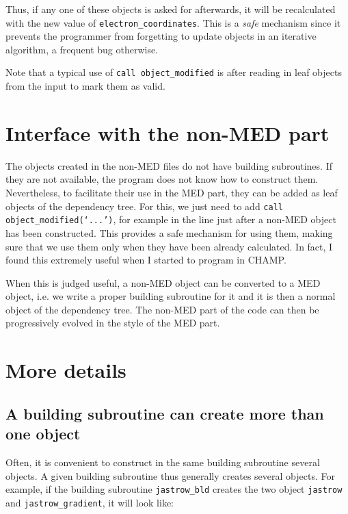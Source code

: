 \documentclass[a4paper,11pt]{article}
\begin{document}
Thus, if any one of these objects is asked for afterwards, it will be recalculated with the new value of {\tt electron_coordinates}. This is a {\it safe} mechanism since it prevents the programmer from forgetting to update objects in an iterative algorithm, a frequent bug otherwise.

Note that a typical use of {\tt call object_modified} is after reading in leaf objects from the input to mark them as valid.

\section{Interface with the non-MED part}

The objects created in the non-MED files do not have building subroutines. If they are not available, the program does not know how to construct them. Nevertheless, to facilitate their use in the MED part, they can be added as leaf objects of the dependency tree. For this, we just need to add {\tt call object_modified(`...')}, for example in the line just after a non-MED object has been constructed. This provides a safe mechanism for using them, making sure that we use them only when they have been already calculated. In fact, I found this extremely useful when I started to program in CHAMP. 

When this is judged useful, a non-MED object can be converted to a MED object, i.e. we write a proper building subroutine for it and it is then a normal object of the dependency tree. The non-MED part of the code can then be progressively evolved in the style of the MED part.


\section{More details}

\subsection{A building subroutine can create more than one object}

Often, it is convenient to construct in the same building subroutine several objects. A given building subroutine thus generally creates several objects. For example, if the building subroutine {\tt jastrow_bld} creates the two object {\tt jastrow} and {\tt jastrow_gradient}, it will look like:
\end{document}
